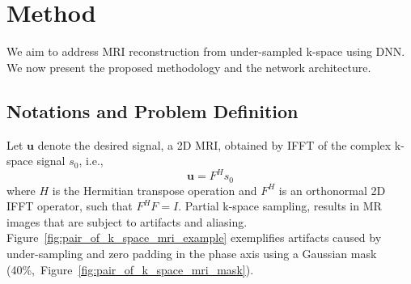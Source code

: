 \documentclass[10pt,journal,compsoc]{IEEEtran}
\begin{document}
\section{Method}\label{method_section}
We aim to address MRI reconstruction from under-sampled k-space using DNN. We now present the proposed methodology and the network architecture.
\subsection{Notations and Problem Definition}
Let $\bm{u}$ denote the desired signal, a 2D MRI, obtained by IFFT of the complex k-space signal $s_{0}$, i.e., 
\begin{equation}
\bm{u}=F^{H}s_{0}
\end{equation} 
where $H$ is the Hermitian transpose operation and $F^{H}$ is an orthonormal 2D IFFT operator, such that $F^{H}F=I$. 
Partial k-space sampling, results in MR images that are subject to artifacts and aliasing. 
Figure~\ref{fig:pair_of_k_space_mri_example} exemplifies artifacts caused by under-sampling and zero padding in the phase axis using a Gaussian mask (40\%,~Figure~\ref{fig:pair_of_k_space_mri_mask}).
\vspace{-0.5cm}
\end{document}
